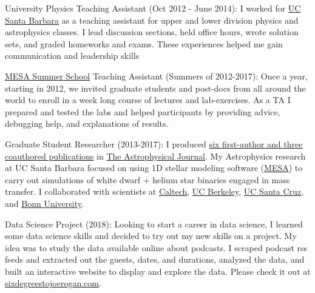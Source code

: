 \documentclass[10pt]{article} %
\begin{document}
\jobb
{University Physics Teaching Assistant (Oct 2012 - June 2014):}
{I worked for \href{http://www.ucsb.edu}{UC Santa Barbara} as a teaching assistant for upper and lower division physics and astrophysics classes.}
{I lead discussion sections, held office hours, wrote solution sets, and graded homeworks and exams. These experiences helped me gain communication and leadership skills}%

\jobb
{\href{http://cococubed.asu.edu/mesa_summer_school_2017/}{MESA Summer School} Teaching Assistant (Summers of 2012-2017):}
{Once a year, starting in 2012, we invited graduate students and post-docs from all around the world to enroll in a week long course of lectures and lab-exercises.}%
{As a TA I prepared and tested the labs and helped participants by providing advice, debugging help, and explanations of results.}

\jobb
{Graduate Student Researcher (2013-2017):}
{I produced \href{http://adsabs.harvard.edu/cgi-bin/nph-abs_connect?library&libname=MyPapers&libid=561872b258}{six first-author and three coauthored publications} in \href{http://iopscience.iop.org/journal/0004-637X}{The Astrophysical Journal}.}
{My Astrophysics research at UC Santa Barbara focused on using 1D stellar modeling software (\href{http://mesa.sourceforge.net/}{MESA}) to carry out simulations of white dwarf + helium star binaries engaged in mass transfer. I collaborated with scientists at \href{https://www.caltech.edu/}{Caltech}, \href{www.berkeley.edu/}{UC Berkeley}, \href{https://www.ucsc.edu}{UC Santa Cruz}, and \href{https://www.uni-bonn.de/}{Bonn University}.}%

\jobb
{Data Science Project (2018):}
{Looking to start a career in data science, I learned some data science skills and decided to try out my new skills on a project. My idea was to study the data available online about podcasts.}
{I scraped podcast rss feeds and extracted out the guests, dates, and durations, analyzed the data, and built an interactive website to display and explore the data. Please check it out at \href{http://www.sixdegreestojoerogan.com/}{sixdegreestojoerogan.com}}.
\end{document}
